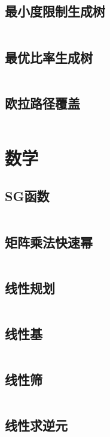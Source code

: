 \documentclass[UTF8]{ctexart}
\begin{document}
\subsection{最小度限制生成树}
\inputminted{cpp}{graphtheory/最小度限制生成树.cpp}

\subsection{最优比率生成树}
\inputminted{cpp}{graphtheory/最优比率生成树.cpp}

\subsection{欧拉路径覆盖}
\inputminted{cpp}{graphtheory/欧拉路径覆盖.cpp}

\section{数学}



\subsection{SG函数}
\inputminted{cpp}{math/SG函数.cpp}

\subsection{矩阵乘法快速幂}
\inputminted{cpp}{math/矩阵乘法快速幂.cpp}

\subsection{线性规划}
\inputminted{cpp}{math/线性规划.cpp}

\subsection{线性基}
\inputminted{cpp}{math/线性基.cpp}

\subsection{线性筛}
\inputminted{cpp}{math/线性筛.cpp}

\subsection{线性求逆元}
\inputminted{cpp}{math/线性求逆元.cpp}
\end{document}
